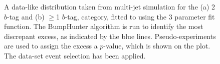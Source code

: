 \begin{figure}[!ht]
  \begin{center}
   \captionsetup[subfigure]{aboveskip=0pt,justification=centering}
  \end{center}
  \caption{A data-like distribution taken from multi-jet simulation for the (a) 2 $b$-tag and (b) $\geq$1 $b$-tag,
    category, fitted to using the 3 parameter fit function.
    The BumpHunter algorithm is run to identify the most discrepant excess, as indicated by the blue lines.
    Pseudo-experiments are used to assign the excess a \mbox{$p$-value}, which is shown on the plot.
    The \summer{} data-set event selection has been applied.}
  \label{fig:DataLikeSearchPhase}
\end{figure}


